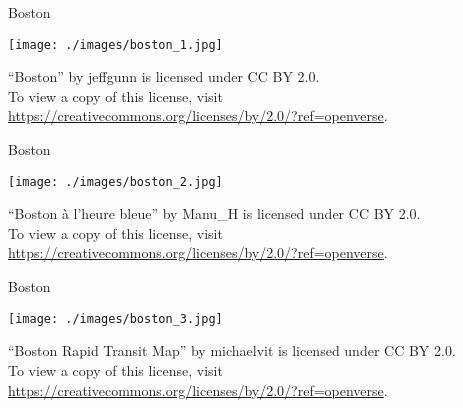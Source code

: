 \documentclass[aspectratio=169,xcolor={dvipsnames,table}]{beamer}
\begin{document}
\begin{frame}[plain]{Boston}

\raggedleft

\texttt{[image: ./images/boston\_1.jpg]}

\vspace*{-8pt}
\tiny

``Boston'' by jeffgunn is licensed under CC BY 2.0. \\
To view a copy of this license, visit \url{https://creativecommons.org/licenses/by/2.0/?ref=openverse}.
  \end{frame}
\begin{frame}[plain]{Boston}

\raggedleft

\texttt{[image: ./images/boston\_2.jpg]}

\vspace*{-8pt}
\tiny


``Boston \`{a} l'heure bleue'' by Manu\_H is licensed under CC BY 2.0.\\
To view a copy of this license, visit \url{https://creativecommons.org/licenses/by/2.0/?ref=openverse}.

 \end{frame}
\begin{frame}[plain]{Boston}

\raggedleft

\texttt{[image: ./images/boston\_3.jpg]}

\vspace*{-8pt}
\tiny

``Boston Rapid Transit Map'' by michaelvit is licensed under CC BY 2.0.\\
 To view a copy of this license, visit \url{https://creativecommons.org/licenses/by/2.0/?ref=openverse}.
 \end{frame}
\end{document}
